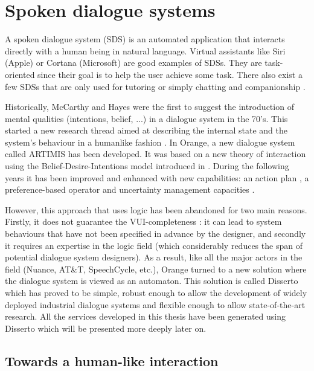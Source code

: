 \section{Spoken dialogue systems}
        
A spoken dialogue system (SDS) is an automated application that interacts directly with a human being in natural language. Virtual assistants like Siri (Apple) or Cortana (Microsoft) are good examples of SDSs. They are task-oriented since their goal is to help the user achieve some task. There also exist a few SDSs that are only used for tutoring \cite{Jordan2015} or simply chatting and companionship \cite{Sidner2013}.

Historically, McCarthy and Hayes were the first to suggest the introduction of mental qualities (intentions, belief, ...) in a dialogue system \cite{McCarthy1969,McCarthy1979} in the 70's. This started a new research thread aimed at describing the internal state and the system's behaviour in a humanlike fashion \cite{Newell1980,Bratman1987,Cohen1990,Sadek1991,Konolige1993}. In Orange, a new dialogue system called ARTIMIS has been developed. It was based on a new theory of interaction \cite{Sadek1991} using the Belief-Desire-Intentions model introduced in \cite{Bratman1988}. During the following years it has been improved and enhanced with new capabilities: an action plan \cite{Louis2002}, a preference-based operator \cite{Meyer2006} and uncertainty management capacities \cite{Laroche2008}.

However, this approach that uses logic has been abandoned for two main reasons. Firstly, it does not guarantee the VUI-completeness \cite{Pieraccini2005,Paek2008}: it can lead to system behaviours that have not been specified in advance by the designer, and secondly it requires an expertise in the logic field (which considerably reduces the span of potential dialogue system designers). As a result, like all the major actors in the field (Nuance, AT\&T, SpeechCycle, etc.), Orange turned to a new solution where the dialogue system is viewed as an automaton. This solution is called Disserto which has proved to be simple, robust enough to allow the development of widely deployed industrial dialogue systems and flexible enough to allow state-of-the-art research. All the services developed in this thesis have been generated using Disserto which will be presented more deeply later on.

\subsection{Towards a human-like interaction}
  \label{soa:humanlike}
  
